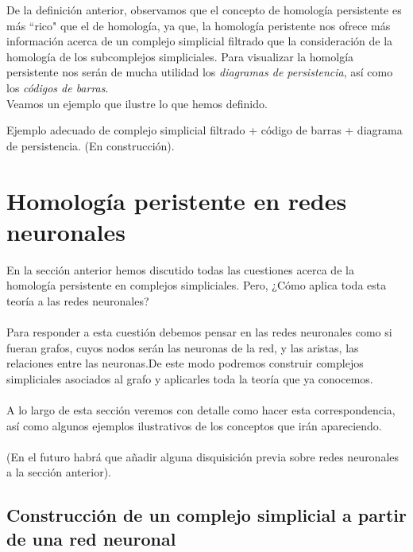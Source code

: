 \documentclass[12pt, a4paper]{article}
\numberwithin{equation}{section}
\theoremstyle{definition}
\newenvironment{ejem}
  {\pushQED{\qed}\renewcommand{\qedsymbol}{$\blacktriangleleft$}\ejemplo}
  {\popQED\endejemplo}
\theoremstyle{remark}
\theoremstyle{plain}
\begin{document}
		

		De la definición anterior, observamos que el concepto de homología persistente es más ``rico" que el de homología, ya que, la homología peristente nos ofrece más
		información acerca de un complejo simplicial filtrado que la consideración de la homología de los subcomplejos simpliciales. Para visualizar la homolgía persistente
		nos serán de mucha utilidad los \textit{diagramas de persistencia}, así como los \textit{códigos de barras}.\\
		Veamos un ejemplo que ilustre lo que hemos definido.
		
		\begin{ejem}	
			Ejemplo adecuado de complejo simplicial filtrado + código de barras + diagrama de persistencia. (En construcción).
		\end{ejem}

	\section{Homología peristente en redes neuronales}

		En la sección anterior hemos discutido todas las cuestiones 
		acerca de la homología persistente en complejos simpliciales. 
		Pero, ¿Cómo aplica toda esta teoría a las redes neuronales? \\
		\\
		Para responder a esta cuestión debemos pensar en las redes 
		neuronales como si fueran grafos, cuyos nodos serán las neuronas 
		de la red, y las aristas, las relaciones entre las neuronas.De 
		este modo podremos construir complejos simpliciales asociados 
		al grafo y aplicarles toda la teoría que ya conocemos. \\
		\\
		A lo largo de esta sección veremos con detalle como hacer esta 
		correspondencia, así como algunos ejemplos ilustrativos de los 
		conceptos que irán apareciendo.\\
		\\
		(En el futuro habrá que añadir alguna disquisición previa sobre redes neuronales a la sección anterior).

	\subsection{Construcción de un complejo simplicial a partir de una red neuronal}
\end{document}
